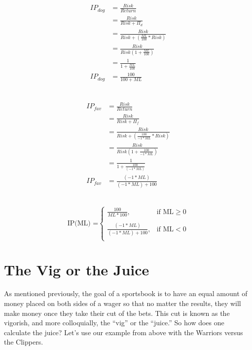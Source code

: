 \documentclass [MS] {uclathes}
\begin{document}
\noindent {} \\
\begin{equation} \label{ip_dog}
\begin{split}
IP_{dog} & = \frac{Risk}{Return}  \\
& = \frac{Risk}{Risk + \Pi_{d}}  \\
& = \frac{Risk}{Risk + \left( \frac{ML}{100}*Risk \right)} \\ 
& = \frac{Risk}{Risk \left( 1 + \frac{ML}{100}  \right)} \\ 
& = \frac{1}{ 1 + \frac{ML}{100} } \\ 
IP_{dog} & = \frac{100}{100 + ML} 
\end{split}
\end{equation}


\noindent {} \\
\begin{equation} \label{ip_fav}
\begin{split}
IP_{fav} & = \frac{Risk}{Return}  \\
& = \frac{Risk}{Risk + \Pi_{f}}  \\
& = \frac{Risk}{Risk + \left( \frac{100}{-1 * ML} * Risk \right) } \\ 
& = \frac{Risk}{Risk \left( 1 + \frac{100}{-1 * ML}  \right)} \\ 
& = \frac{1}{ 1 + \frac{100}{(-1 * ML)} } \\ 
IP_{fav} & = \frac{(-1 * ML)}{(-1 * ML) + 100} 
\end{split}
\end{equation}

\noindent {} \\
\begin{equation} \label{ip_gen}
\text{IP(ML) =}
\begin{cases}
\displaystyle
 \frac{100}
 {ML * 100},  & \text{if ML} \geq 0 \\ \\ 
\displaystyle
 \frac{(-1 * ML)}
 {(-1 * ML) +100}, &  \text{if ML} <  0\\ 
\end{cases}
\end{equation}

\section{The Vig or the Juice}
As mentioned previously, the goal of a sportsbook is to have an equal amount of money placed on both sides of a wager so that no matter the results, they will make money once they take their cut of the bets. This cut is known as the vigorish, and more colloquially, the ``vig'' or the ``juice.'' So how does one calculate the juice? Let's use our example from above with the Warriors versus the Clippers.
\end{document}
